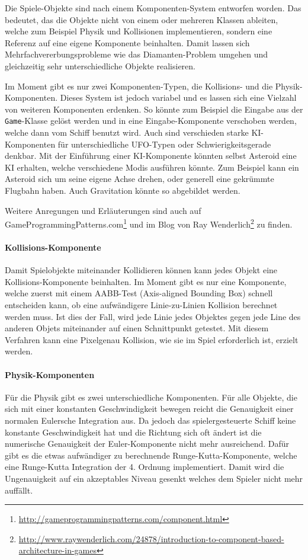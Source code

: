 \documentclass[12pt, a4paper, titlepage, hidelinks]{scrreprt}
\begin{document}
Die Spiele-Objekte sind nach einem Komponenten-System entworfen worden. Das bedeutet, das die Objekte nicht von einem oder mehreren Klassen ableiten, welche zum Beispiel Physik und Kollisionen implementieren, sondern eine Referenz auf eine eigene Komponente beinhalten. Damit lassen sich Mehrfachvererbungsprobleme wie das Diamanten-Problem umgehen und gleichzeitig sehr unterschiedliche Objekte realisieren.

Im Moment gibt es nur zwei Komponenten-Typen, die Kollisions- und die Physik-Komponenten. Dieses System ist jedoch variabel und es lassen sich eine Vielzahl von weiteren Komponenten erdenken. So könnte zum Beispiel die Eingabe aus der \texttt{Game}-Klasse gelöst werden und in eine Eingabe-Komponente verschoben werden, welche dann vom Schiff benutzt wird. Auch sind verschieden starke KI-Komponenten für unterschiedliche UFO-Typen oder Schwierigkeitsgerade denkbar. Mit der Einführung einer KI-Komponente könnten selbst Asteroid eine KI erhalten, welche verschiedene Modis ausführen könnte. Zum Beispiel kann ein Asteroid sich um seine eigene Achse drehen, oder generell eine gekrümmte Flugbahn haben. Auch Gravitation könnte so abgebildet werden.

Weitere Anregungen und Erläuterungen sind auch auf GameProgrammingPatterns.com\footnote{\url{http://gameprogrammingpatterns.com/component.html}} und im Blog von Ray Wenderlich\footnote{\url{http://www.raywenderlich.com/24878/introduction-to-component-based-architecture-in-games}} zu finden.

\paragraph{Kollisions-Komponente}
Damit Spielobjekte miteinander Kollidieren können kann jedes Objekt eine Kollisions-Komponente beinhalten. Im Moment gibt es nur eine Komponente, welche zuerst mit einem AABB-Test (Axis-aligned Bounding Box) schnell entscheiden kann, ob eine aufwändigere Linie-zu-Linien Kollision berechnet werden muss. Ist dies der Fall, wird jede Linie jedes Objektes gegen jede Line des anderen Objets miteinander auf einen Schnittpunkt getestet. Mit diesem Verfahren kann eine Pixelgenau Kollision, wie sie im Spiel erforderlich ist, erzielt werden.

\paragraph{Physik-Komponenten}
Für die Physik gibt es zwei unterschiedliche Komponenten. Für alle Objekte, die sich mit einer konstanten Geschwindigkeit bewegen reicht die Genauigkeit einer normalen Eulersche Integration aus. Da jedoch das spielergesteuerte Schiff keine konstante Geschwindigkeit hat und die Richtung sich oft ändert ist die numerische Genauigkeit der Euler-Komponente nicht mehr ausreichend. Dafür gibt es die etwas aufwändiger zu berechnende Runge-Kutta-Komponente, welche eine Runge-Kutta Integration der 4. Ordnung implementiert. Damit wird die Ungenauigkeit auf ein akzeptables Niveau gesenkt welches dem Spieler nicht mehr auffällt.
\end{document}
